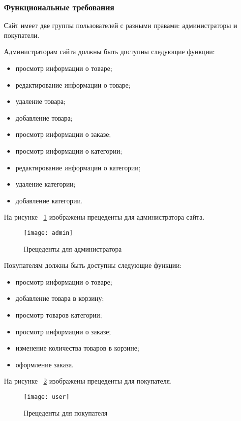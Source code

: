 \subsubsection{Функциональные требования}

Сайт имеет две группы пользователей с разными правами: администраторы и покупатели.

Администраторам сайта должны быть доступны следующие функции:
\begin{itemize}
	\item просмотр информации о товаре;
	\item редактирование информации о товаре;
	\item удаление товара;
	\item добавление товара;
	\item просмотр информации о заказе;
	\item просмотр информации о категории;
	\item редактирование информации о категории;
	\item удаление категории;
	\item добавление категории.
\end{itemize}

На рисунке ~\ref{admin:image} изображены прецеденты для администратора сайта.

\begin{figure}[h!]
	\texttt{[image: admin]}
	\caption{Прецеденты для администратора}
	\label{admin:image}
\end{figure}

Покупателям должны быть доступны следующие функции:
\begin{itemize}
	\item просмотр информации о товаре;
	\item добавление товара в корзину;
	\item просмотр товаров категории;
	\item просмотр информации о заказе;
	\item изменение количества товаров в корзине;
	\item оформление заказа.
\end{itemize}

На рисунке ~\ref{user:image} изображены прецеденты для покупателя.
\begin{figure}[h!]
	\texttt{[image: user]}
	\caption{Прецеденты для покупателя}
	\label{user:image}
\end{figure}


